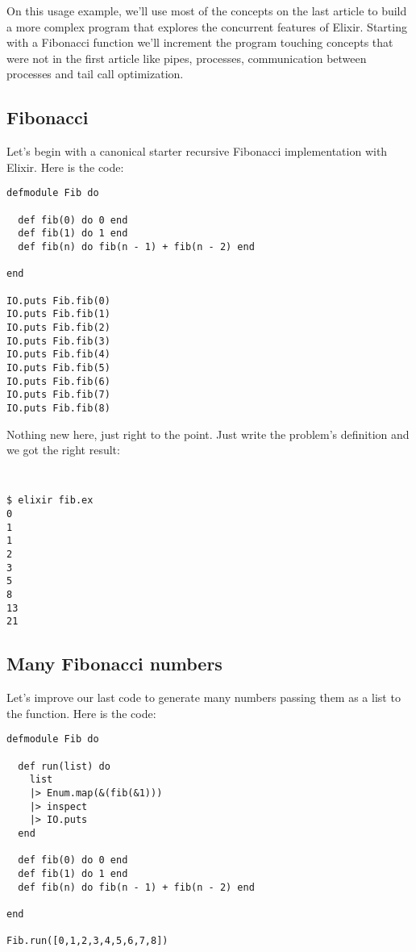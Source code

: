 On this usage example, we'll use most of the concepts on the last article to 
build a more complex program that explores the concurrent features of Elixir.
Starting with a Fibonacci function we'll increment the program touching concepts
that were not in the first article like pipes, processes, communication between 
processes and tail call optimization.

\subsection{Fibonacci}

Let's begin with a canonical starter recursive Fibonacci implementation with 
Elixir. Here is the code:

\begin{lstlisting}[label=efib1,caption=Classic Fibonacci]
defmodule Fib do

  def fib(0) do 0 end
  def fib(1) do 1 end
  def fib(n) do fib(n - 1) + fib(n - 2) end

end

IO.puts Fib.fib(0)
IO.puts Fib.fib(1)
IO.puts Fib.fib(2)
IO.puts Fib.fib(3)
IO.puts Fib.fib(4)
IO.puts Fib.fib(5)
IO.puts Fib.fib(6)
IO.puts Fib.fib(7)
IO.puts Fib.fib(8)
\end{lstlisting}

Nothing new here, just right to the point. Just write the problem's definition 
and we got the right result:

\begin{verbatim}
  
\end{verbatim}

\begin{verbatim}
$ elixir fib.ex 
0
1
1
2
3
5
8
13
21
\end{verbatim}

\subsection{Many Fibonacci numbers}

Let's improve our last code to generate many numbers passing them as a list to 
the function. Here is the code:

\begin{lstlisting}[label=emf,caption=Many Fibonacci numbers]
defmodule Fib do

  def run(list) do
    list
    |> Enum.map(&(fib(&1)))
    |> inspect
    |> IO.puts
  end

  def fib(0) do 0 end
  def fib(1) do 1 end
  def fib(n) do fib(n - 1) + fib(n - 2) end

end

Fib.run([0,1,2,3,4,5,6,7,8])
\end{lstlisting}

